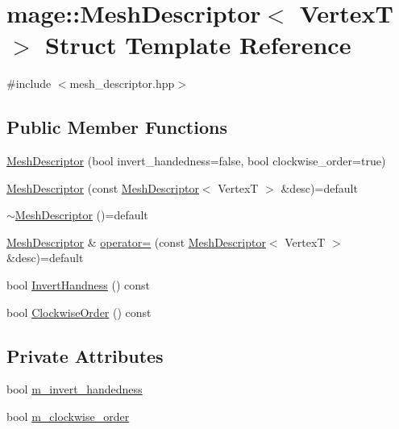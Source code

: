 \hypertarget{structmage_1_1_mesh_descriptor}{}\section{mage\+:\+:Mesh\+Descriptor$<$ VertexT $>$ Struct Template Reference}
\label{structmage_1_1_mesh_descriptor}


{\ttfamily \#include $<$mesh\+\_\+descriptor.\+hpp$>$}

\subsection*{Public Member Functions}
\begin{DoxyCompactItemize}
\item 
\hyperlink{structmage_1_1_mesh_descriptor_ae9c4651675fc0600fca01f0614c70762}{Mesh\+Descriptor} (bool invert\+\_\+handedness=false, bool clockwise\+\_\+order=true)
\item 
\hyperlink{structmage_1_1_mesh_descriptor_ab6347b2a60fbdf11573ddfe9283616d4}{Mesh\+Descriptor} (const \hyperlink{structmage_1_1_mesh_descriptor}{Mesh\+Descriptor}$<$ VertexT $>$ \&desc)=default
\item 
\hyperlink{structmage_1_1_mesh_descriptor_adca32db164ab3032164c8dfe17af3db4}{$\sim$\+Mesh\+Descriptor} ()=default
\item 
\hyperlink{structmage_1_1_mesh_descriptor}{Mesh\+Descriptor} \& \hyperlink{structmage_1_1_mesh_descriptor_aef6a9568a8d4516dbeff4d8f665ca213}{operator=} (const \hyperlink{structmage_1_1_mesh_descriptor}{Mesh\+Descriptor}$<$ VertexT $>$ \&desc)=default
\item 
bool \hyperlink{structmage_1_1_mesh_descriptor_a7f63b926282683dcb0f674eca0901f5e}{Invert\+Handness} () const
\item 
bool \hyperlink{structmage_1_1_mesh_descriptor_ab81b000d93242ae002227010c4a9446c}{Clockwise\+Order} () const
\end{DoxyCompactItemize}
\subsection*{Private Attributes}
\begin{DoxyCompactItemize}
\item 
bool \hyperlink{structmage_1_1_mesh_descriptor_af7b8124e44ac65ca2088d5d8ca0639f5}{m\+\_\+invert\+\_\+handedness}
\item 
bool \hyperlink{structmage_1_1_mesh_descriptor_a7e769c8d1d81b3514b951b306865dc88}{m\+\_\+clockwise\+\_\+order}
\end{DoxyCompactItemize}


